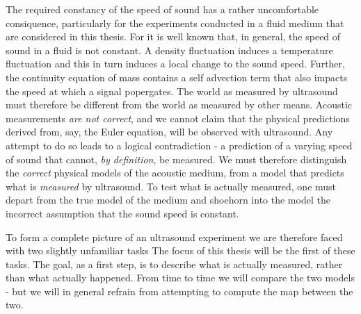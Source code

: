 The required constancy of the speed of sound has a rather uncomfortable consiquence,
particularly for the experiments conducted in a fluid medium that are considered in this thesis.
For it is well known that, in general, the speed of sound in a fluid is not constant.
A density fluctuation induces a temperature fluctuation and this in turn induces a local change to the sound speed.
Further, the continuity equation of mass contains a self advection term that also impacts the speed at which a signal popergates.
The world as measured by ultrasound must therefore be different from the world as measured by other means.
Acoustic measurements {\em are not correct}, 
and we cannot claim that the physical predictions derived from, say, the Euler equation,
will be observed with ultrasound.
Any attempt to do so leads to a logical contradiction -
a prediction of a varying speed of sound that cannot, {\em by definition}, be measured.
We must therefore distinguish the {\em correct} physical models of the acoustic medium,
from a model that predicts what is {\em measured} by ultrasound. 
To test what is actually measured,
one must depart from the true model of the medium and shoehorn into the model the incorrect assumption that the sound speed is constant.


To form a complete picture of an ultrasound experiment we are therefore faced with two slightly unfamiliar tasks
The focus of this thesis will be the first of these tasks.
The goal, as a first step, is to describe what is actually measured,
rather than what actually happened.
From time to time we will compare the two models -
but we will in general refrain from attempting to compute the map between the two.

